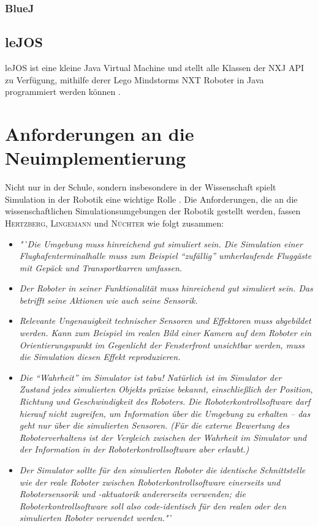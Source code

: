 \documentclass[paper=a4, pagesize, DIV=calc, BCOR=12.5mm, twoside=on, onecolumn=on, open = any, titlepage =on, parskip =half-, headsepline = on, footsepline = on, chapterprefix = on, appendixprefix = off, fontsize = 12pt, numbers = noenddot, abstract = on]{scrbook}
\numberwithin{equation}{chapter}
\theoremstyle{definition}
\theoremstyle{plain}
\theoremstyle{plain}
\theoremstyle{remark}
\theoremstyle{plain}
\theoremstyle{plain}
\begin{document}
\subsection{BlueJ}
\label{sec:bluej}

\par \singlespacing
\section{leJOS}
\label{sec:lejos}
\onehalfspacing
leJOS ist eine kleine Java Virtual Machine und stellt alle Klassen der NXJ API zu Verfügung, mithilfe derer Lego Mindstorms NXT Roboter in Java programmiert werden können \cite{lejos}.


\par \singlespacing
\chapter{Anforderungen an die Neuimplementierung}
\label{chap:anforderungen}
\onehalfspacing
Nicht nur in der Schule, sondern insbesondere in der Wissenschaft spielt Simulation in der Robotik eine wichtige Rolle \cite[S.13]{hertzberg:12}. Die Anforderungen, die an die wissenschaftlichen Simulationsumgebungen der Robotik gestellt werden, fassen \textsc{Hertzberg, Lingemann} und \textsc{Nüchter} wie folgt zusammen:
\begin{itemize}
\item \emph{"`Die Umgebung muss hinreichend gut simuliert sein. Die Simulation einer Flughafenterminalhalle muss zum Beispiel "`zufällig"' umherlaufende Fluggäste mit Gepäck und Transportkarren umfassen.}
\item \emph{Der Roboter in seiner Funktionalität muss hinreichend gut simuliert sein. Das betrifft seine Aktionen wie auch seine Sensorik.}
\item\emph{Relevante Ungenauigkeit technischer Sensoren und Effektoren muss abgebildet werden. Kann zum Beispiel im realen Bild einer Kamera auf dem Roboter ein Orientierungspunkt im Gegenlicht der Fensterfront unsichtbar werden, muss die Simulation diesen Effekt reproduzieren.}
\item \emph{Die "`Wahrheit"' im Simulator ist tabu! Natürlich ist im Simulator der Zustand jedes simulierten Objekts präzise bekannt, einschließlich der Position, Richtung und Geschwindigkeit des Roboters. Die Roboterkontrollsoftware darf hierauf nicht zugreifen, um Information über die Umgebung zu erhalten -- das geht nur über die simulierten Sensoren. (Für die externe Bewertung des Roboterverhaltens ist der Vergleich zwischen der Wahrheit im Simulator und der Information in der Roboterkontrollsoftware aber erlaubt.)}
\item \emph{Der Simulator sollte für den simulierten Roboter die identische Schnittstelle wie der reale Roboter zwischen Roboterkontrollsoftware einerseits und Robotersensorik und -aktuatorik andererseits verwenden; die Roboterkontrollsoftware soll also code-identisch für den realen oder den simulierten Roboter verwendet werden."'} \cite[S.14]{hertzberg:12}
\end{itemize}
\end{document}
